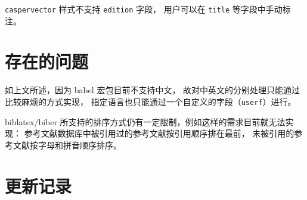 \documentclass[UTF8, fancyhdr, hyperref]{ctexart}
\begin{document}
\verb|caspervector| 样式不支持 \verb|edition| 字段，
用户可以在 \verb|title| 等字段中手动标注。

\section{存在的问题}

如上文所述，因为 babel 宏包目前不支持中文，
故对中英文的分别处理只能通过比较麻烦的方式实现，
指定语言也只能通过一个自定义的字段（\verb|userf|）进行。

biblatex/biber 所支持的排序方式仍有一定限制，例如这样的需求目前就无法实现：
参考文献数据库中被引用过的参考文献按引用顺序排在最前，
未被引用的参考文献按字母和拼音顺序排序。

\section{更新记录}

\printbibliography%
	[heading = bibnumbered, title = {本文参考文献}, category = cited]
\printbibliography[
	heading = bibnumbered, notcategory = cited,
	title = {%
		其它参考文献示例
		（引自\texorpdfstring{文献 \parencite{gbt7714-2005}}{ GB/T 7714-2005}）
	}
]
\end{document}
